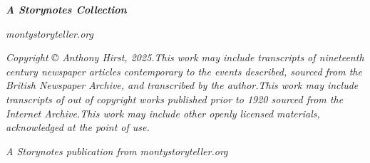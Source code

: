 
  \newpage
  \thispagestyle{plain}
  \thispagestyle{empty}

  \makeatletter

  \vspace*{\fill}

  \begin{center}
  {\large \textbf{\textit{A Storynotes Collection}}}\\[2em]
  \end{center}

  \vfill

  \begin{center}
  \large \textit{montystoryteller.org}
  \end{center}

  \vspace{2cm}

  \begin{center}
  \textit{Copyright {\copyright} Anthony Hirst, 2025.\linebreak\linebreak This work may include transcripts of nineteenth century newspaper articles contemporary to the events described, sourced from the British Newspaper Archive, and transcribed by the author.\linebreak\linebreak This work may include transcripts of out of copyright works published prior to 1920 sourced from the Internet Archive.\linebreak\linebreak This work may include other openly licensed materials, acknowledged at the point of use.
  }
  \end{center}

  \vspace*{\fill}

  \begin{center}
    \textit{A Storynotes publication from montystoryteller.org}
  \end{center}
  \makeatother